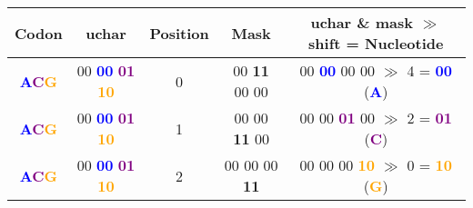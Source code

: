 \newcommand{\blue}[1]{\textbf{\textcolor{blue}{#1}}}
\newcommand{\purple}[1]{\textbf{\textcolor{purple}{#1}}}
\newcommand{\orange}[1]{\textbf{\textcolor{orange}{#1}}}

\begingroup\centering
\begin{tabular}{c|c|c|c|c}
Codon & uchar & Position & Mask & uchar \& mask $\gg$ shift = Nucleotide\\
\hline
\blue{A}\purple{C}\orange{G} & 00 \blue{00} \purple{01} \orange{10} & 0 & 00 \textbf{11} 00 00 & 00 \blue{00} 00 00 $\gg$ 4 \hspace{0.8em}= \blue{00} (\blue{A})\\
\blue{A}\purple{C}\orange{G} & 00 \blue{00} \purple{01} \orange{10} & 1 & 00 00 \textbf{11} 00 & 00 00 \purple{01} 00 $\gg$ 2 \hspace{0.8em}= \purple{01} (\purple{C})\\
\blue{A}\purple{C}\orange{G} & 00 \blue{00} \purple{01} \orange{10} & 2 & 00 00 00 \textbf{11} & 00 00 00 \orange{10} $\gg$ 0 \hspace{0.8em}= \orange{10} (\orange{G})\\
\end{tabular}
\par\endgroup